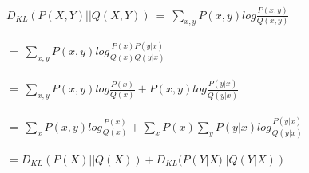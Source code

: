 \newcommand\tab[1][1cm]{\hspace*{#1}}
\begin{answer}
\\ \\
$D_{KL}(P(X,Y)||Q(X, Y)) \ = \ \sum_{x, y} P(x, y)log\frac{P(x,y)}{Q(x,y)}$ \\ \\
\tab[3cm] $ = \ \sum_{x, y} P(x, y)log\frac{P(x)P(y|x)}{Q(x)Q(y|x)}$ \\ \\
\tab[3cm] $ = \ \sum_{x, y} P(x, y)log\frac{P(x)}{Q(x)} +P(x, y)log\frac{P(y|x)}{Q(y|x)} $ \\ \\
\tab[3cm] $ = \ \sum_{x} P(x, y)log\frac{P(x)}{Q(x)} + \sum_{x}P(x)\sum_{y}P(y|x)log\frac{P(y|x)}{Q(y|x)} $ \\ \\
\tab[3cm] $ = D_{KL}(P(X)||Q(X)) + D_{KL}(P(Y|X)||Q(Y|X)) $ \\ \\
\end{answer}
